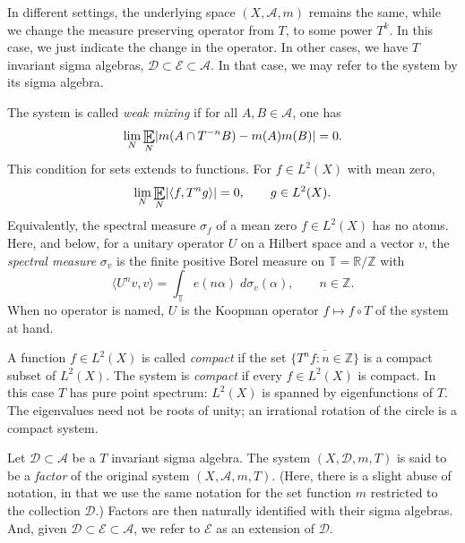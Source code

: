 In different settings, the underlying space $(X,\mathcal A, m )$ remains the same, while we change the measure preserving operator from $T$, to some power $T^k$. 
In this case, we  just indicate the change in the operator.  
In other cases, we have  $T$ invariant sigma algebras, $\mathcal D \subset \mathcal E \subset \mathcal A$. 
In that case, we may refer to the system by its sigma algebra. 

The system is called \emph{weak mixing} if for all $A, B\in \mathcal A$, one has 
\begin{equation} \label{e:weaklyMixingDef}
    \lim_N \Expectation_N \lvert 
    m(A\cap T^{-n}B) - m(A)m(B) \rvert =0. 
\end{equation}
This condition for sets extends to functions. For $f\in L^2(X)$ with mean zero,  
\begin{equation} \label{wm-functions}
    \lim_N \Expectation_N  
    \lvert \langle f, T^n g \rangle \rvert =0, \qquad g \in L^2(X). 
\end{equation}
Equivalently, the spectral measure $\sigma _f$ of a mean zero $f \in L^2(X)$ has no atoms.  
Here, and below, for a unitary operator $U$ on a Hilbert space and a vector $v$, the \emph{spectral measure} $\sigma _v$ 
is the finite positive Borel measure on $\mathbb T = \mathbb R/\mathbb Z$ with 
\begin{equation} \label{e:spectral}
\langle U ^{n}v, v\rangle = \int_{\mathbb T} e(n \alpha ) \;d \sigma _v ( \alpha ), \qquad n \in \mathbb Z . 
\end{equation}
When no operator is named, $U$ is the Koopman operator $f \mapsto f\circ T$ of the system at hand.  
  






\bigskip 

A function $f\in L^2(X)$ is called \emph{compact} if the set $\overline{ \{T^n f \colon n\in \mathbb{Z}\} }$ is a compact subset of $L^2 (X)$.  The system is \emph{compact} if every $f\in L^2(X)$  is compact.  In this case $T$ has pure point spectrum: $L^2(X)$ is spanned by eigenfunctions of $T$.  
The eigenvalues need not be roots of unity; an irrational rotation of the circle is a compact system.  


\smallskip 
Let $\mathcal D \subset \mathcal A$ be a $T$ invariant 
sigma algebra. The system 
$(X,\mathcal D, m , T)$ is said to be a \emph{factor} of 
the original system $(X,\mathcal A,m ,T)$.  
(Here, there is a slight abuse of notation, in that we use the same notation for the set function $m$ restricted to the collection $\mathcal D$.) 
Factors are then naturally identified with their sigma algebras. 
And, given $\mathcal D\subset \mathcal E \subset \mathcal A$, 
we refer to $ \mathcal E$ as an extension of $\mathcal D$.  

